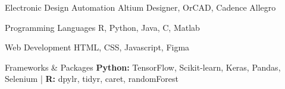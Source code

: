 

\begin{cvskills}



  \cvskill
    {Electronic Design Automation} %
    {Altium Designer, OrCAD, Cadence Allegro} %





  \cvskill
    {Programming Languages} %
    {R, Python, Java, C, Matlab} %













  \cvskill
    {Web Development} %
    {HTML, CSS, Javascript, Figma} %

  \cvskill
    {Frameworks \& Packages } %
    {\textbf{Python:} TensorFlow, Scikit-learn, Keras, Pandas, Selenium | \textbf{R:} dpylr, tidyr, caret, randomForest } %






\end{cvskills}
